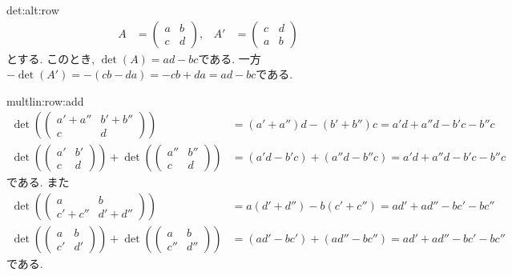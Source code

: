 \begin{proofof}{det:alt:row}
  \begin{align*}
    A&=\begin{pmatrix}a&b\\c&d\end{pmatrix},&
    A'&=\begin{pmatrix}c&d\\a&b\end{pmatrix}
  \end{align*}
  とする.
  このとき, $\det(A)=ad-bc$である.
  一方$-\det(A')=-(cb-da)=-cb+da=ad-bc$である.
\end{proofof}
  
  
\begin{proofof}{multlin:row:add}
      \begin{align*}
        \det(\begin{pmatrix}a'+a''&b'+b''\\c&d\end{pmatrix})
          &=(a'+a'')d-(b'+b'')c=a'd+a''d-b'c-b''c\\
        \det(\begin{pmatrix}a'&b'\\c&d\end{pmatrix})
          +
          \det(\begin{pmatrix}a''&b''\\c&d\end{pmatrix})
            &=(a'd-b'c)+(a''d-b''c)=a'd+a''d-b'c-b''c
      \end{align*}
      である.
      また
      \begin{align*}
        \det(\begin{pmatrix}a&b\\c'+c''&d'+d''\end{pmatrix})&=
          a(d'+d'')-b(c'+c'')=ad'+ad''-bc'-bc''\\
        \det(\begin{pmatrix}a&b\\c'&d'\end{pmatrix})+
          \det(\begin{pmatrix}a&b\\c''&d''\end{pmatrix})
            &=(ad'-bc')+(ad''-bc'')=ad'+ad''-bc'-bc''
      \end{align*}
      である.
\end{proofof}

